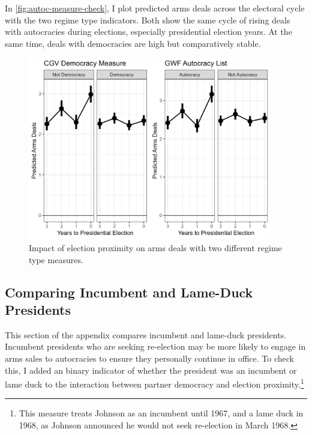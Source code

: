 \documentclass[12pt]{article}
\begin{document}
In \autoref{fig:autoc-measure-check}, I plot predicted arms deals across the electoral cycle with the two regime type indicators. 
Both show the same cycle of rising deals with autocracies during elections, especially presidential election years. 
At the same time, deals with democracies are high but comparatively stable. 

\begin{figure}[htpb]
	\centering
		\includegraphics[width=0.95\textwidth]{autoc-measure-check.png}
	\caption{Impact of election proximity on arms deals with two different regime type measures.}
	\label{fig:autoc-measure-check}
\end{figure}



\subsection{Comparing Incumbent and Lame-Duck Presidents}

This section of the appendix compares incumbent and lame-duck presidents. 
Incumbent presidents who are seeking re-election may be more likely to engage in arms sales to autocracies to ensure they personally continue in office. 
To check this, I added an binary indicator of whether the president was an incumbent or lame duck to the interaction between partner democracy and election proximity.\footnote{This measure treats Johnson as an incumbent until 1967, and a lame duck in 1968, as Johnson announced he would not seek re-election in March 1968.}
\end{document}
